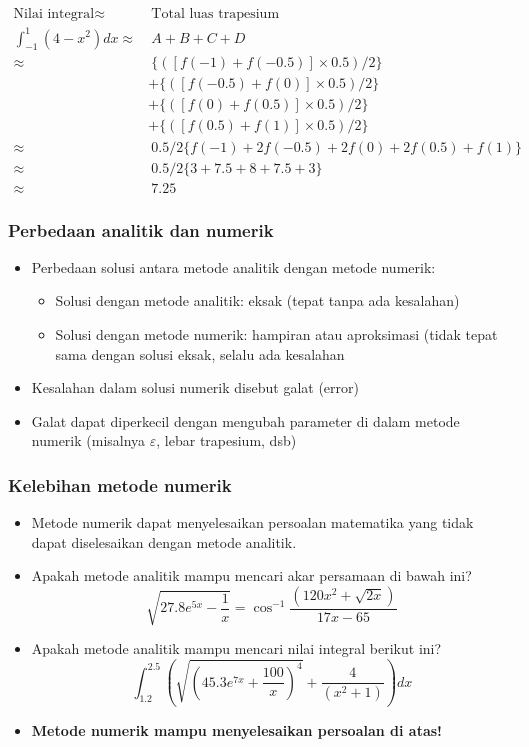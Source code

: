 \documentclass[pdflatex,compress]{beamer}
\begin{document}
\begin{frame}
	\begin{align*}
		\text{Nilai integral} \approx&~ \text{Total luas trapesium} \\
		\int_{-1}^{1} (4-x^2) dx  \approx&~  A + B + C + D \\
		\approx&~ \{([ f(-1) + f(-0.5) ] \times 0.5) / 2 \} \\
		&+ \{([ f(-0.5) + f(0) ] \times 0.5) / 2 \} \\
		&+ \{([ f(0) + f(0.5) ] \times 0.5) / 2 \} \\
		&+ \{([ f(0.5) + f(1) ] \times 0.5) / 2 \} \\
		\approx&~ 0.5/2 \{ f(-1) + 2f(-0.5) + 2f(0) + 2f(0.5) + f(1) \} \\
		\approx&~ 0.5/2 \{ 3 + 7.5 + 8 + 7.5 + 3 \} \\
		\approx&~ 7.25
	\end{align*}
\end{frame}

\begin{frame}
	\frametitle{Perbedaan analitik dan numerik}
	\begin{itemize}
		\item Perbedaan solusi antara metode analitik dengan metode numerik:
		\begin{itemize}
			\item Solusi dengan metode analitik: eksak (tepat tanpa ada kesalahan)
			\item Solusi dengan metode numerik: hampiran atau aproksimasi (tidak tepat sama dengan solusi eksak, selalu ada kesalahan
		\end{itemize}
		\item Kesalahan dalam solusi numerik disebut galat (error)
		\item Galat dapat diperkecil dengan mengubah parameter di dalam metode numerik (misalnya $\varepsilon$, lebar trapesium, dsb)
	\end{itemize}
\end{frame}

\begin{frame}
	\frametitle{Kelebihan metode numerik}
	\begin{itemize}
		\item Metode numerik dapat menyelesaikan persoalan matematika yang tidak dapat diselesaikan dengan metode analitik.
		\item Apakah metode analitik mampu mencari akar persamaan di bawah ini?
		 \[ \sqrt{27.8e^{5x} - \frac{1}{x}} = \cos^{-1}\frac{(120x^2 + \sqrt{2x})}{17x-65}\]
		 \item Apakah metode analitik mampu mencari nilai integral berikut ini?
	 	\[ \int_{1.2}^{2.5} \left( \sqrt{\left(45.3e^{7x}+\frac{100}{x}\right)^4} + \frac{4}{(x^2 + 1)} \right) dx \]
	 	\item \textbf{Metode numerik mampu menyelesaikan persoalan di atas! }
	\end{itemize}
\end{frame}
\end{document}
